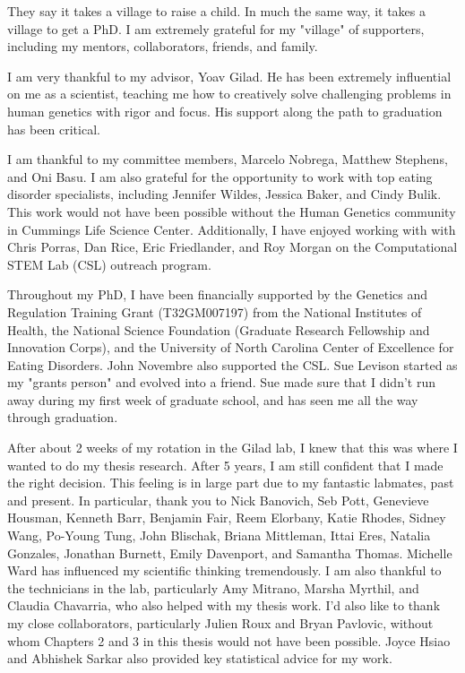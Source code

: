 \acknowledgments

They say it takes a village to raise a child. In much the same way, it takes a village to get a PhD. I am extremely grateful for my "village" of supporters, including my mentors, collaborators, friends, and family.

I am very thankful to my advisor, Yoav Gilad. He has been extremely influential on me as a scientist, teaching me how to creatively solve challenging problems in human genetics with rigor and focus. His support along the path to graduation has been critical. 

I am thankful to my committee members, Marcelo Nobrega, Matthew Stephens, and Oni Basu. I am also grateful for the opportunity to work with top eating disorder specialists, including Jennifer Wildes, Jessica Baker, and Cindy Bulik. This work would not have been possible without the Human Genetics
community in Cummings Life Science Center. Additionally, I have enjoyed working with with Chris Porras, Dan Rice, Eric Friedlander, and Roy Morgan on the Computational STEM Lab (CSL) outreach program. 

Throughout my PhD, I have been financially supported by the Genetics and Regulation Training Grant (T32GM007197) from the National Institutes
of Health, the National Science Foundation (Graduate Research Fellowship and Innovation Corps), and the University of North Carolina Center of Excellence for Eating Disorders. John Novembre also supported the CSL. Sue Levison started as my "grants person" and evolved into a friend. Sue made sure that I didn't run away during my first week of graduate school, and has seen me all the way through graduation.   

After about 2 weeks of my rotation in the Gilad lab, I knew that this was where I wanted to do my thesis research. After 5 years, I am still confident that I made the right decision. This feeling is in large part due to my fantastic labmates, past and present. In particular, thank you to Nick Banovich, Seb Pott, Genevieve Housman, Kenneth Barr, Benjamin Fair, Reem Elorbany, Katie Rhodes, Sidney Wang, Po-Young Tung, John Blischak, Briana Mittleman, Ittai Eres, Natalia Gonzales, Jonathan Burnett, Emily Davenport, and Samantha Thomas. Michelle Ward has influenced my scientific thinking tremendously. I am also thankful to the technicians in the lab, particularly Amy Mitrano,
Marsha Myrthil, and Claudia Chavarria, who also helped with my thesis work. I'd also like to thank my close collaborators, particularly Julien Roux and Bryan Pavlovic, without whom Chapters 2 and 3 in this thesis would not have been possible. Joyce Hsiao and Abhishek Sarkar also provided key statistical advice for my work. 

